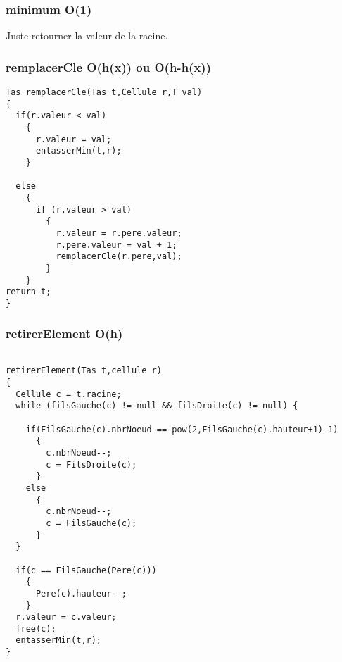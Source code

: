 \documentclass[11pt]{article}
\begin{document}
\subsubsection{minimum O(1)}
\label{sec:org92076ce}

Juste retourner la valeur de la racine.

\subsubsection{remplacerCle O(h(x)) ou O(h-h(x))}
\label{sec:org55f25e8}

\begin{lstlisting}
Tas remplacerCle(Tas t,Cellule r,T val)
{
  if(r.valeur < val)
    {
      r.valeur = val;
      entasserMin(t,r);
    }

  else
    {
      if (r.valeur > val)
        {
          r.valeur = r.pere.valeur;
          r.pere.valeur = val + 1;
          remplacerCle(r.pere,val);
        }
    }
return t;
}
\end{lstlisting}

\subsubsection{retirerElement O(h)}
\label{sec:org6af416f}

\begin{lstlisting}

retirerElement(Tas t,cellule r)
{
  Cellule c = t.racine;
  while (filsGauche(c) != null && filsDroite(c) != null) {

    if(FilsGauche(c).nbrNoeud == pow(2,FilsGauche(c).hauteur+1)-1)
      {
        c.nbrNoeud--;
        c = FilsDroite(c);
      }
    else 
      {
        c.nbrNoeud--;
        c = FilsGauche(c);
      }
  }

  if(c == FilsGauche(Pere(c)))
    {
      Pere(c).hauteur--;
    }
  r.valeur = c.valeur;
  free(c);
  entasserMin(t,r);
}
\end{lstlisting}
\end{document}
